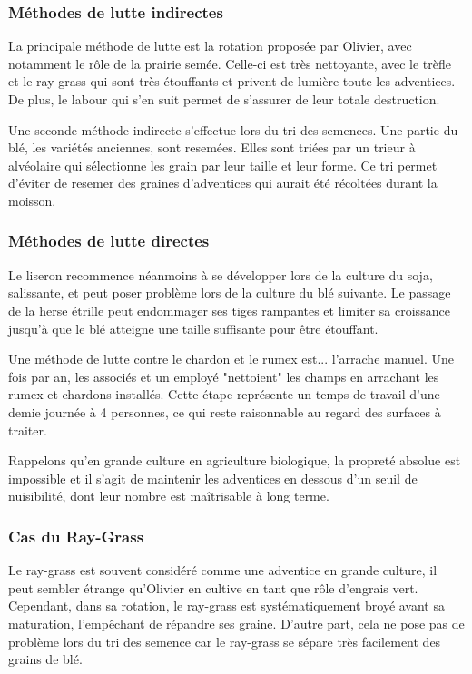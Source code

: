 \documentclass{article}
\begin{document}
\subsubsection{Méthodes de lutte indirectes}

La principale méthode de lutte est la rotation proposée par Olivier, avec notamment le rôle de la prairie semée. Celle-ci est très nettoyante, avec le trèfle et le ray-grass qui sont très étouffants et privent de lumière toute les adventices. De plus, le labour qui s'en suit permet de s'assurer de leur totale destruction. 

Une seconde méthode indirecte s'effectue lors du tri des semences. Une partie du blé, les variétés anciennes, sont resemées. Elles sont triées par un trieur à alvéolaire qui sélectionne les grain par leur taille et leur forme. Ce tri permet d'éviter de resemer des graines d'adventices qui aurait été récoltées durant la moisson.

\subsubsection{Méthodes de lutte directes}

Le liseron recommence néanmoins à se développer lors de la culture du soja, salissante, et peut poser problème lors de la culture du blé suivante. Le passage de la herse étrille peut endommager ses tiges rampantes et limiter sa croissance jusqu'à que le blé atteigne une taille suffisante pour être étouffant. 

Une méthode de lutte contre le chardon et le rumex est... l'arrache manuel. Une fois par an, les associés et un employé "nettoient" les champs en arrachant les rumex et chardons installés. Cette étape représente un temps de travail d'une demie journée à 4 personnes, ce qui reste raisonnable au regard des surfaces à traiter. 

Rappelons qu'en grande culture en agriculture biologique, la propreté absolue est impossible et il s'agit de maintenir les adventices en dessous d'un seuil de nuisibilité, dont leur nombre est maîtrisable à long terme. 

\subsubsection{Cas du Ray-Grass}

Le ray-grass est souvent considéré comme une adventice en grande culture, il peut sembler étrange qu'Olivier en cultive en tant que rôle d'engrais vert. Cependant, dans sa rotation, le ray-grass est systématiquement broyé avant sa maturation, l'empêchant de répandre ses graine. D'autre part, cela ne pose pas de problème lors du tri des semence car le ray-grass se sépare très facilement des grains de blé. 
\end{document}
